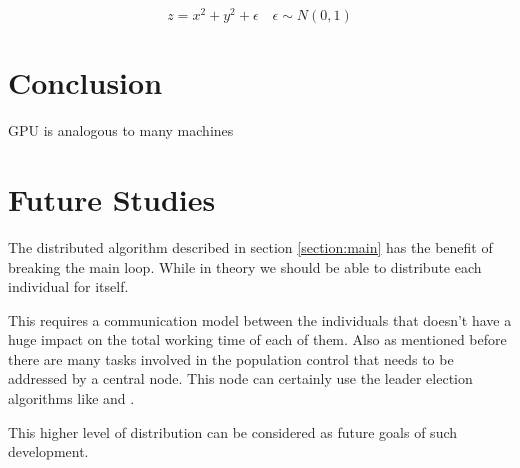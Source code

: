\documentclass[twocolumn]{article}
\begin{document}
\begin{equation}
    \label{eq:ExpectedOutput}
    z=x^2+y^2+\epsilon \quad \epsilon \sim N(0,1)
\end{equation}




\section{Conclusion}

GPU is analogous to many machines


\section{Future Studies}
The distributed algorithm described in section \ref{section:main} has the benefit of breaking the main loop. While in theory we should be able to distribute each individual for itself.

This requires a communication model between the individuals that doesn't have a huge impact on the total working time of each of them. Also as mentioned before there are many tasks involved in the population control that needs to be addressed by a central node. This node can certainly use the leader election algorithms like \cite{LeaderElection1} and \cite{LeaderElection2} .

This higher level of distribution can be considered as future goals of such development.




\end{document}

